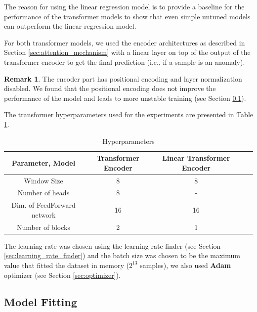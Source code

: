 \documentclass[a4paper, twoside]{report}
\theoremstyle{definition}
\newtheorem{remark}[theorem]{Remark}
\numberwithin{equation}{section}
\begin{document}
The reason for using the linear regression model is to provide a baseline for the performance of the transformer models
to show that even simple untuned models can outperform the linear regression model.

For both transformer models, we used the encoder architectures as described in Section \ref{sec:attention_mechanism}
with a linear layer on top of the output of the transformer encoder to get the final prediction (i.e., if a sample is an anomaly).
\begin{remark}
    The encoder part has positional encoding and layer normalization disabled.
    We found that the positional encoding does not improve the performance of the model and leads to more
    unstable training (see Section \ref{sec:training}).
\end{remark}

The transformer hyperparameters used for the experiments are presented in Table \ref{tab:hyperparameters}.

\begin{table}[h!]
    \centering
    \begin{tabular}{|c|c|c|c|c|}
        \hline
        Parameter, Model            & Transformer Encoder & Linear Transformer Encoder \\
        \hline
        Window Size                 & 8                   & 8                          \\
        Number of heads             & 8                   & -                          \\
        Dim. of FeedForward network & 16                  & 16                         \\
        Number of blocks            & 2                   & 1                          \\
        \hline
    \end{tabular}
    \caption{Hyperparameters}
    \label{tab:hyperparameters}
\end{table}

The learning rate was chosen using the learning rate finder \cite{1506.01186} (see Section \ref{sec:learning_rate_finder})
and the batch size was chosen to be the maximum value that
fitted the dataset in memory ($2^{13}$ samples),
we also used \textbf{Adam} optimizer \cite{Kingma2014AdamAM} (see Section \ref{sec:optimizer}).


\subsection{Model Fitting} \label{sec:training}
\end{document}
